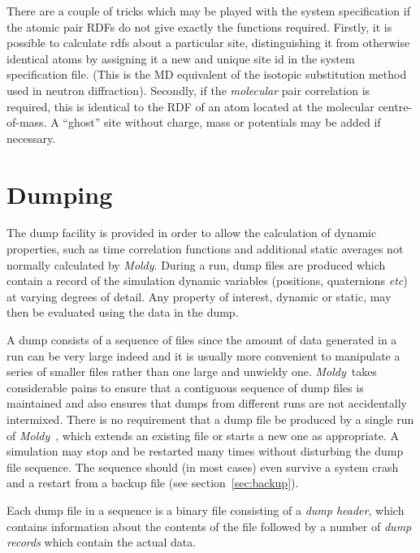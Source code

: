 \documentclass[twoside]{report}
\newcommand{\moldy}{{\em Moldy}}
\newcommand{\etc}{{\em etc}}
\begin{document}
There are a couple of tricks which may be played with the system
specification if the atomic pair RDFs do not give exactly the
functions required.  Firstly, it is possible to calculate rdfs about a
particular site, distinguishing it from otherwise identical atoms by
assigning it a new and unique site id in the system specification
file.  (This is the MD equivalent of the isotopic substitution method
used in neutron diffraction). Secondly, if the {\em molecular\/} pair
correlation is required, this is identical to the RDF of an atom
located at the molecular centre-of-mass.  A ``ghost'' site without
charge, mass or potentials may be added if necessary.
\pagebreak[3]
\section{Dumping}%
\label{sec:dumping}
The dump facility is provided in order to allow the calculation of
dynamic properties, such as time correlation functions and additional
static averages not normally calculated by \moldy.  During a run, dump
files are produced which contain a record of the simulation dynamic
variables (positions, quaternions \etc) at varying degrees of
detail.  Any property of interest, dynamic or static, may then be
evaluated using the data in the dump.

A dump consists of a sequence of files since the amount of data
generated in a run can be very large indeed and it is usually more
convenient to manipulate a series of smaller files rather than one
large and unwieldy one. \moldy\  takes considerable pains to ensure that
a contiguous sequence of dump files is maintained and also ensures
that dumps from different runs are not accidentally intermixed.  There
is no requirement that a dump file be produced by a single run of
\moldy\ , which extends an existing file or starts a new one as appropriate.
A simulation may stop and be restarted many times without
disturbing the dump file sequence.  The  sequence
should (in most cases) even survive a system crash and a restart from
a backup file (see section~\ref{sec:backup}).

Each dump file in a sequence is a binary file consisting of a {\em
dump header}, which contains information about the contents of the
file followed by a number of {\em dump records\/} which contain the
actual data.  
\end{document}
